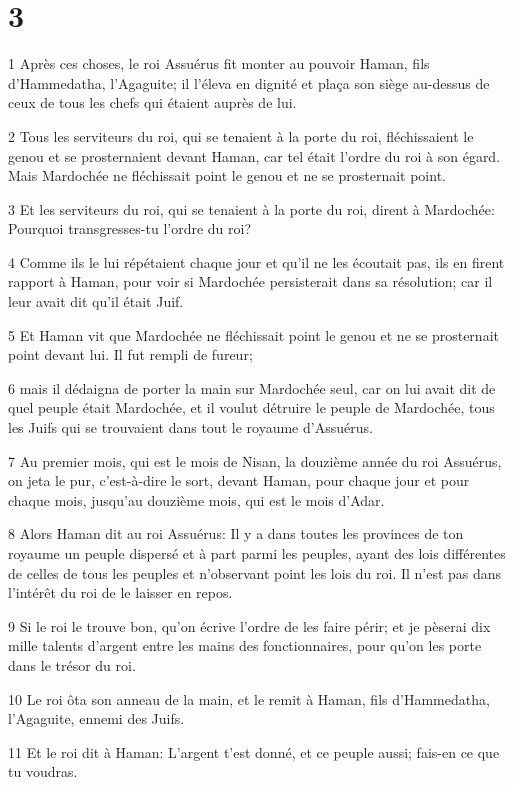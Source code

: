 \chapter{3}

\par 1 Après ces choses, le roi Assuérus fit monter au pouvoir Haman, fils d'Hammedatha, l'Agaguite; il l'éleva en dignité et plaça son siège au-dessus de ceux de tous les chefs qui étaient auprès de lui.
\par 2 Tous les serviteurs du roi, qui se tenaient à la porte du roi, fléchissaient le genou et se prosternaient devant Haman, car tel était l'ordre du roi à son égard. Mais Mardochée ne fléchissait point le genou et ne se prosternait point.
\par 3 Et les serviteurs du roi, qui se tenaient à la porte du roi, dirent à Mardochée: Pourquoi transgresses-tu l'ordre du roi?
\par 4 Comme ils le lui répétaient chaque jour et qu'il ne les écoutait pas, ils en firent rapport à Haman, pour voir si Mardochée persisterait dans sa résolution; car il leur avait dit qu'il était Juif.
\par 5 Et Haman vit que Mardochée ne fléchissait point le genou et ne se prosternait point devant lui. Il fut rempli de fureur;
\par 6 mais il dédaigna de porter la main sur Mardochée seul, car on lui avait dit de quel peuple était Mardochée, et il voulut détruire le peuple de Mardochée, tous les Juifs qui se trouvaient dans tout le royaume d'Assuérus.
\par 7 Au premier mois, qui est le mois de Nisan, la douzième année du roi Assuérus, on jeta le pur, c'est-à-dire le sort, devant Haman, pour chaque jour et pour chaque mois, jusqu'au douzième mois, qui est le mois d'Adar.
\par 8 Alors Haman dit au roi Assuérus: Il y a dans toutes les provinces de ton royaume un peuple dispersé et à part parmi les peuples, ayant des lois différentes de celles de tous les peuples et n'observant point les lois du roi. Il n'est pas dans l'intérêt du roi de le laisser en repos.
\par 9 Si le roi le trouve bon, qu'on écrive l'ordre de les faire périr; et je pèserai dix mille talents d'argent entre les mains des fonctionnaires, pour qu'on les porte dans le trésor du roi.
\par 10 Le roi ôta son anneau de la main, et le remit à Haman, fils d'Hammedatha, l'Agaguite, ennemi des Juifs.
\par 11 Et le roi dit à Haman: L'argent t'est donné, et ce peuple aussi; fais-en ce que tu voudras.
